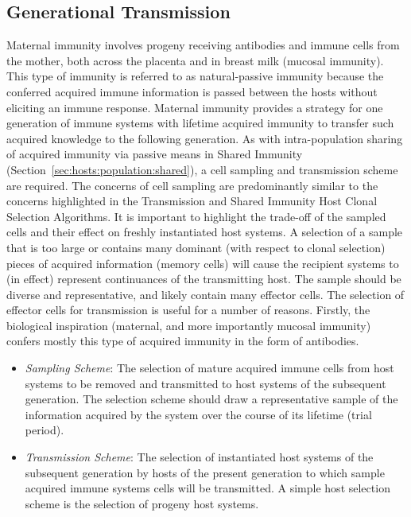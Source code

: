 \subsection{Generational Transmission}
\label{sec:hosts:generational:maternal:theory}
Maternal immunity involves progeny receiving antibodies and immune cells from the mother, both across the placenta and in breast milk (mucosal immunity). This type of immunity is referred to as natural-passive immunity because the conferred acquired immune information is passed between the hosts without eliciting an immune response.
Maternal immunity provides a strategy for one generation of immune systems with lifetime acquired immunity to transfer such acquired knowledge to the following generation.
As with intra-population sharing of acquired immunity via passive means in Shared Immunity (Section~\ref{sec:hosts:population:shared}), a cell sampling and transmission scheme are required. The concerns of cell sampling are predominantly similar to the concerns highlighted in the Transmission and Shared Immunity Host Clonal Selection Algorithms. It is important to highlight the trade-off of the sampled cells and their effect on freshly instantiated host systems. A selection of a sample that is too large or contains many dominant (with respect to clonal selection) pieces of acquired information (memory cells) will cause the recipient systems to (in effect) represent continuances of the transmitting host. The sample should be diverse and representative, and likely contain many effector cells. The selection of effector cells for transmission is useful for a number of reasons. Firstly, the biological inspiration (maternal, and more importantly mucosal immunity) confers mostly this type of acquired immunity in the form of antibodies. 

\begin{itemize}
	\item \emph{Sampling Scheme}: The selection of mature acquired immune cells from host systems to be removed and transmitted to host systems of the subsequent generation. The selection scheme should draw a representative sample of the information acquired by the system over the course of its lifetime (trial period).
	\item \emph{Transmission Scheme}: The selection of instantiated host systems of the subsequent generation by hosts of the present generation to which sample acquired immune systems cells will be transmitted. A simple host selection scheme is the selection of progeny host systems.
\end{itemize}



